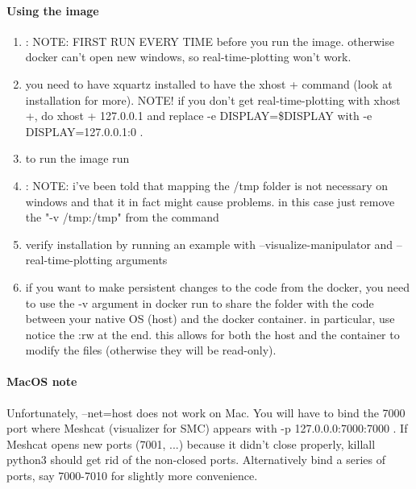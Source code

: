 \paragraph{Using the image}
\begin{enumerate}
\item   [Linux and MAC]: NOTE: FIRST RUN  EVERY TIME before you run the image. otherwise docker can't open new windows,
   so real-time-plotting won't work. 
\item [MAC] you need to have xquartz installed to have the xhost + command (look at installation for more).
   NOTE! if you don't get real-time-plotting with xhost +, do xhost + 127.0.0.1 and replace -e DISPLAY=\$DISPLAY with 
   -e DISPLAY=127.0.0.1:0 .
\item to run the image run 
		\newline
\item   [WINDOWS]: NOTE: i've been told that mapping the /tmp folder is not necessary on windows and that it in fact might cause problems.
   in this case just remove the "-v /tmp:/tmp" from the command
\item verify installation by running an example with --visualize-manipulator and --real-time-plotting arguments
\item if you want to make persistent changes to the code from the docker, you need to use the -v argument in docker run to share the folder
   with the code between your native OS (host) and the docker container. 
   in particular, use 
   \newline
   notice the :rw at the end. this allows for both the host and the container to modify the files (otherwise they will be read-only).
\end{enumerate}

\paragraph{MacOS note}
Unfortunately, --net=host does not work on Mac. You will have to bind the 7000 port where Meshcat (visualizer for SMC) appears
with -p 127.0.0.0:7000:7000 . If Meshcat opens new ports (7001, ...) because it didn't close properly, killall python3 should get rid
of the non-closed ports. Alternatively bind a series of ports, say 7000-7010 for slightly more convenience.

